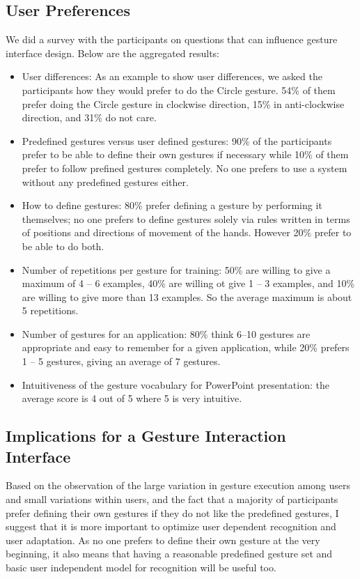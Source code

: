 \subsection{User Preferences}\label{sec:preferences}
We did a survey with the participants on questions that can influence
gesture interface design. Below are the aggregated results:
\begin{itemize}
  \item User differences: As an example to show user differences, we asked
  the participants how they would prefer to do the Circle gesture. 54\%
  of them prefer doing the Circle gesture in clockwise direction, 15\% in
  anti-clockwise direction, and 31\% do not care.
  \item Predefined gestures versus user defined gestures: 90\%
  of the participants prefer to be able to define their own gestures if necessary while 10\% of them prefer to follow prefined
  gestures completely. No one prefers to use a system without any predefined
  gestures either.
  \item How to define gestures: 80\% prefer defining a gesture by 
  performing it themselves; no one prefers to
  define gestures solely via rules written in terms of positions and directions
  of movement of the hands.
  However 20\% prefer to be able to do both.
  \item Number of repetitions per gesture for training: 50\% are willing to give a
  maximum of 4 -- 6 examples, 40\% are willing ot give 1 -- 3 examples, and 10\%
  are willing to give more than 13 examples. So the average maximum is about 5
  repetitions.
  \item Number of gestures for an application: 80\% think 6--10 gestures are
  appropriate and easy to remember for a given application, while 20\% prefers 1
  -- 5 gestures, giving an average of 7 gestures.
  \item Intuitiveness of the gesture vocabulary for PowerPoint presentation:
  the average score is 4 out of 5 where 5 is very intuitive.
\end{itemize}

\subsection{Implications for a Gesture Interaction Interface}
Based on the observation of the large variation in gesture execution among
users and small variations within users, and the fact that a majority of
participants prefer defining their own gestures if they do not like the
predefined gestures, I suggest that it is more important to optimize user
dependent recognition and user adaptation. As no one prefers to define their own
gesture at the very beginning, it also means that having a reasonable predefined gesture set and
basic user independent model for recognition will be useful too.

